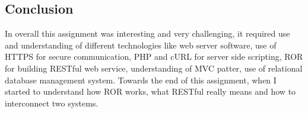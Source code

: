 \documentclass[10pt,a4paper,headinclude=true,twoside]{report}
\begin{document}
\subsection{Conclusion}
In overall this assignment was interesting and very challenging, it required use and understanding of different technologies like web server software, use of HTTPS for secure communication, PHP and cURL for server side scripting, ROR for building RESTful web service, understanding of MVC patter, use of relational database management system. Towards the end of this assignment, when I started to understand how ROR works, what RESTful really means and how to interconnect two systems.  




\end{document}
